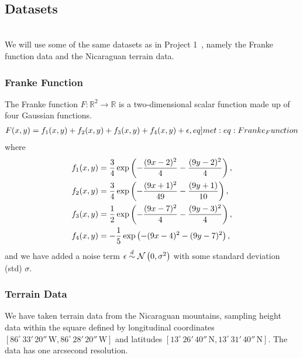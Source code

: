 \\
\subsection{Datasets}
    \\
    We will use some of the same datasets as in Project 1~\cite{Project1}, namely the Franke function data and the Nicaraguan terrain data.
    \subsubsection{Franke Function}
        The Franke function $F: \mathbb{R}^2 \to \mathbb{R}$ is a two-dimensional scalar function made up of four Gaussian functions.
        \begin{align}
            F(x,y) = f_1(x,y) + f_2(x,y) + f_3(x,y) + f_4(x,y) + \epsilon, \label[eq]{met:eq:Franke_Function}
        \end{align}
        where
        \begin{subequations}
            \begin{align}
                f_1(x,y) &= \frac{3}{4}\operatorname{exp}\left( -\frac{(9x-2)^2}{4} - \frac{(9y-2)^2}{4} \right), \\
                f_2(x,y) &= \frac{3}{4}\operatorname{exp}\left( -\frac{(9x+1)^2}{49} - \frac{(9y+1)}{10} \right), \\
                f_3(x,y) &= \frac{1}{2}\operatorname{exp}\left( -\frac{(9x-7)^2}{4} - \frac{(9y-3)^2}{4} \right), \\
                f_4(x,y) &= -\frac{1}{5}\operatorname{exp}\left( -(9x-4)^2 - (9y-7)^2 \right),
            \end{align}
        \end{subequations}
        and we have added a noise term $\epsilon \overset{d}{\sim} \operatorname{\mathcal{N}}\left(0,\sigma^2\right)$ with some standard deviation (std) $\sigma$.

    \subsubsection{Terrain Data}
        We have taken terrain data from the Nicaraguan mountains, sampling height data within the square defined by longitudinal coordinates $[86^\circ\,33'\,20''\,\text{W}, 86^\circ\,28'\,20''\,\text{W}]$ and latitudes $[13^\circ\,26'\,40''\,\text{N}, 13^\circ\,31'\,40''\,\text{N}]$. The data has one arcsecond resolution.

